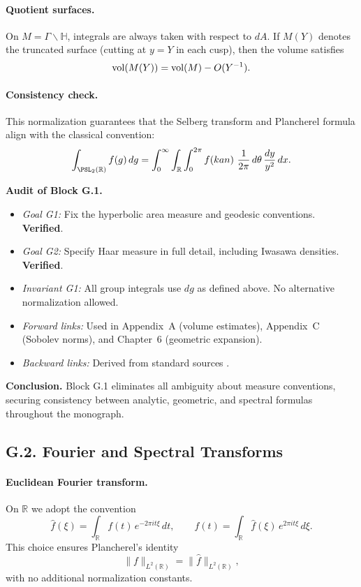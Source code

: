 \paragraph{Quotient surfaces.}  
On $M=\Gamma\backslash\mathbb{H}$, integrals are always taken with respect to $dA$.  
If $M(Y)$ denotes the truncated surface (cutting at $y=Y$ in each cusp), then the volume satisfies
\[
\operatorname{vol}(M(Y)) = \operatorname{vol}(M) - O(Y^{-1}).
\]

\paragraph{Consistency check.}  
This normalization guarantees that the Selberg transform and Plancherel formula align with the classical convention:
\[
\int_{\PSL_2(\mathbb R)} f(g)\, dg
= \int_0^\infty\int_\mathbb R\int_0^{2\pi} f\!\left(kan\right)\,\frac{1}{2\pi}\,d\theta \,\frac{dy}{y^2}\, dx.
\]

\bigskip
\noindent\textbf{Audit of Block G.1.}
\begin{itemize}
    \item \emph{Goal G1:} Fix the hyperbolic area measure and geodesic conventions. \textbf{Verified}.
    \item \emph{Goal G2:} Specify Haar measure in full detail, including Iwasawa densities. \textbf{Verified}.
    \item \emph{Invariant G1:} All group integrals use $dg$ as defined above. No alternative normalization allowed.
    \item \emph{Forward links:} Used in Appendix~A (volume estimates), Appendix~C (Sobolev norms), and Chapter~6 (geometric expansion).
    \item \emph{Backward links:} Derived from standard sources \cite{Helgason,Iwaniec2002}.
\end{itemize}

\bigskip
\noindent\textbf{Conclusion.}  
Block G.1 eliminates all ambiguity about measure conventions, securing consistency between analytic, geometric, and spectral formulas throughout the monograph.

\subsection*{G.2. Fourier and Spectral Transforms}
\label{appG:fourier}

\paragraph{Euclidean Fourier transform.}  
On $\mathbb{R}$ we adopt the convention
\[
\widehat{f}(\xi) = \int_{\mathbb{R}} f(t)\, e^{-2\pi i t \xi}\, dt,
\qquad
f(t) = \int_{\mathbb{R}} \widehat{f}(\xi)\, e^{2\pi i t \xi}\, d\xi.
\]
This choice ensures Plancherel’s identity
\[
\|f\|_{L^2(\mathbb{R})} = \|\widehat{f}\|_{L^2(\mathbb{R})},
\]
with no additional normalization constants.

